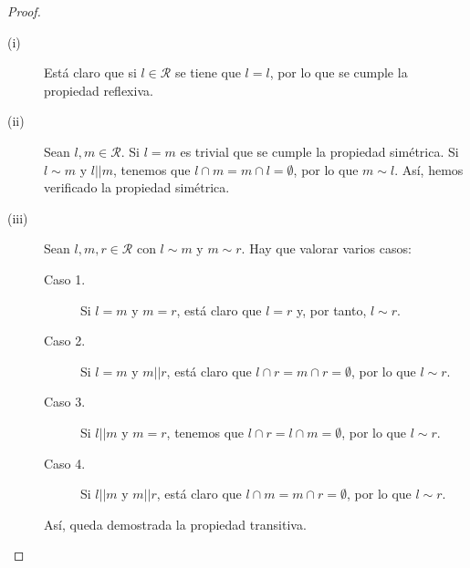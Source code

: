 \begin{proof}
\begin{description}
\item[(i)] Está claro que si $\displaystyle l \in \mathcal{R} $ se tiene que $\displaystyle l = l $, por lo que se cumple la propiedad reflexiva. 
\item[(ii)] Sean $\displaystyle l,m \in \mathcal{R} $. Si $\displaystyle l = m $ es trivial que se cumple la propiedad simétrica. Si $\displaystyle l \sim m $ y $\displaystyle l | | m $, tenemos que $\displaystyle l \cap m = m \cap l = \emptyset $, por lo que $\displaystyle m \sim l $. Así, hemos verificado la propiedad simétrica.
\item[(iii)] Sean $\displaystyle l,m,r \in \mathcal{R} $ con $\displaystyle l \sim m $ y $\displaystyle m \sim r $. Hay que valorar varios casos:
	\begin{description}
	\item[Caso 1.] Si $\displaystyle l = m $ y $\displaystyle m = r $, está claro que $\displaystyle l = r $ y, por tanto, $\displaystyle l \sim r $.
	\item[Caso 2.] Si $\displaystyle l = m $ y $\displaystyle m | | r $, está claro que $\displaystyle l \cap r = m \cap r = \emptyset $, por lo que $\displaystyle l \sim r $.
	\item[Caso 3.] Si $\displaystyle l | | m $ y $\displaystyle m = r $, tenemos que $\displaystyle l \cap r = l \cap m = \emptyset $, por lo que $\displaystyle l \sim r $.
	\item[Caso 4.] Si $\displaystyle l | | m  $ y $\displaystyle m | | r $, está claro que $\displaystyle l \cap m = m \cap r = \emptyset $, por lo que $\displaystyle l \sim r $.
	\end{description}
	Así, queda demostrada la propiedad transitiva.
\end{description}
\end{proof}

